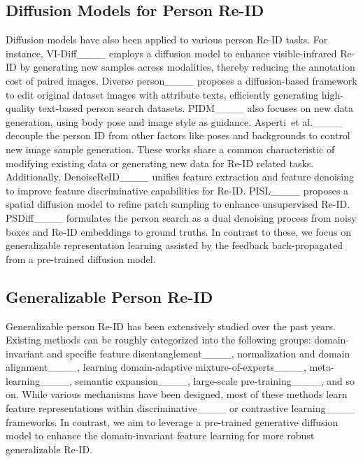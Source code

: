 \subsection{Diffusion Models for Person Re-ID}
Diffusion models have also been applied to various person Re-ID tasks. For instance, VI-Diff____ employs a diffusion model to enhance visible-infrared Re-ID by generating new samples across modalities, thereby reducing the annotation cost of paired images. Diverse person____ proposes a diffusion-based framework to edit original dataset images with attribute texts, efficiently generating high-quality text-based person search datasets. PIDM____ also focuses on new data generation, using body pose and image style as guidance. Asperti~{et al.}____ decouple the person ID from other factors like poses and backgrounds to control new image sample generation. These works share a common characteristic of modifying existing data or generating new data for Re-ID related tasks. Additionally, DenoiseReID____ unifies feature extraction and feature denoising to improve feature discriminative capabilities for Re-ID. {PISL____ proposes a spatial diffusion model to refine patch sampling to enhance unsupervised Re-ID. PSDiff____ formulates the person search as a dual denoising process from noisy boxes and Re-ID embeddings to ground truths.} In contrast to these, we focus on generalizable representation learning assisted by the feedback back-propagated from a pre-trained diffusion model.

\subsection{Generalizable Person Re-ID}
Generalizable person Re-ID has been extensively studied over the past years. Existing methods can be roughly categorized into the following groups: domain-invariant and specific feature disentanglement____, normalization and domain alignment____, learning domain-adaptive mixture-of-experts____, meta-learning____, semantic expansion____, large-scale pre-training____, and so on. While various mechanisms have been designed, most of these methods learn feature representations within discriminative____ or contrastive learning____ frameworks. In contrast, we aim to leverage a pre-trained generative diffusion model to enhance the domain-invariant feature learning for more robust generalizable Re-ID.

